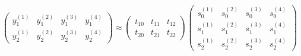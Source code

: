 \documentclass{article}
\begin{document}
\[ \left( \begin{array}{cccc}
y_1^{(1)} & y_1^{(2)} & y_1^{(3)} & y_1^{(4)}\\
y_2^{(1)} & y_2^{(2)} & y_2^{(3)} &y_2^{(4)}\end{array} \right)\approx \left( \begin{array}{ccc}
t_{10} & t_{11} & t_{12}\\ t_{20} & t_{21} & t_{22}\end{array} \right)\left( \begin{array}{cccc}
s_0^{(1)} & s_0^{(2)} & s_0^{(3)} & s_0^{(4)}\\
s_1^{(1)} & s_1^{(2)} & s_1^{(3)} & s_1^{(4)}\\
s_2^{(1)} & s_2^{(2)} & s_2^{(3)} &s_2^{(4)}\end{array} \right)\] 
\end{document}
